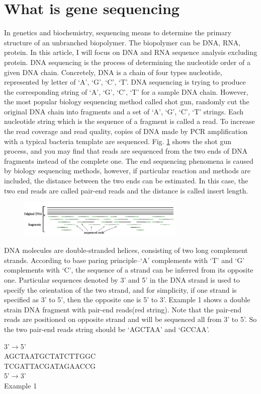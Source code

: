 \documentclass{article}
\begin{document}
\section{What is gene sequencing}
In genetics and biochemistry, sequencing means to determine the primary structure of an unbranched biopolymer. The biopolymer can be DNA, RNA, protein. In this article, I will focus on DNA and RNA sequence analysis excluding protein. DNA sequencing is the process of determining the nucleotide order of a given DNA chain. Concretely, DNA is a chain of four types nucleotide, represented by letter of `A', `G', `C', `T'. DNA sequencing is trying to produce the corresponding string of `A', `G', `C', `T' for a sample DNA chain. However, the most popular biology sequencing method called shot gun, randomly cut the original DNA chain into fragments and a set of `A', `G', `C', `T' strings. Each nucleotide string which is the sequence of a fragment is called a read. To increase the read coverage and read quality, copies of DNA made by PCR amplification with a typical bacteria template are sequenced. Fig. \ref{shot_gun_method} shows the shot gun process, and you may find that reads are sequenced from the two ends of DNA fragments instead of the complete one. The end sequencing phenomena is caused by biology sequencing methods, however, if particular reaction and methods are included, the distance between the two ends can be estimated. In this case, the two end reads are called pair-end reads and the distance is called insert length.\\
\begin{figure}[ht]
  \centering
  \includegraphics[width=8cm]{Figure1.jpg}\\
  \caption{}\label{shot_gun_method}
\end{figure}
DNA molecules are double-stranded helices, consisting of two long complement strands. According to base paring principle--`A' complements with `T' and `G' complements with `C', the sequence of a strand can be inferred from its opposite one. Particular sequences denoted by 3' and 5' in the DNA strand is used to specify the orientation of the two strand, and for simplicity, if one strand is specified as 3' to 5', then the opposite one is 5' to 3'. Example 1 shows a double strain DNA fragment with pair-end reads(red string). Note that the pair-end reads are positioned on opposite strand and will be sequenced all from 3' to 5'. So the two pair-end reads string should be `AGCTAA' and `GCCAA'.
\begin{center}
  3'$\rightarrow$5'\\
  {\color{red}AGCTAA}TGCTATCTTGGC\\
  TCGATTACGATAG{\color{red}AACCG}\\
  5'$\rightarrow$3'\\
  Example 1\\
\end{center}
\end{document}

